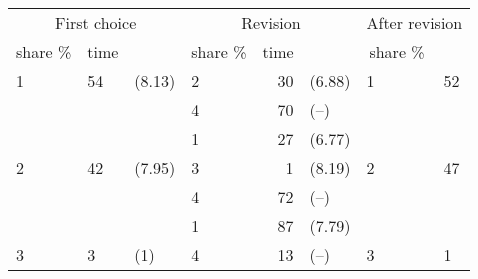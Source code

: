 
\begin{tabular}{llllrlll}
\toprule
\multicolumn{3}{c}{First choice} & \multicolumn{3}{c}{Revision} & \multicolumn{2}{c}{After revision} \\
\cmidrule(l{3pt}r{3pt}){1-3} \cmidrule(l{3pt}r{3pt}){4-6} \cmidrule(l{3pt}r{3pt}){7-8}
\multicolumn{1}{c}{share \%} & \multicolumn{1}{c}{time} & \multicolumn{1}{c}{} & \multicolumn{1}{c}{share \%} & \multicolumn{1}{c}{time} & \multicolumn{1}{c}{} & \multicolumn{1}{c}{share \%} \\
\cmidrule(l{3pt}r{3pt}){1-1} \cmidrule(l{3pt}r{3pt}){2-2} \cmidrule(l{3pt}r{3pt}){4-4} \cmidrule(l{3pt}r{3pt}){5-5} \cmidrule(l{3pt}r{3pt}){7-7}
1 & 54 & (8.13) & 2 & 30 & (6.88) & 1 & 52\\
 &  &  & 4 & 70 & (--) &  & \\
 &  &  & 1 & 27 & (6.77) &  & \\
2 & 42 & (7.95) & 3 & 1 & (8.19) & 2 & 47\\
 &  &  & 4 & 72 & (--) &  & \\
\addlinespace
 &  &  & 1 & 87 & (7.79) &  & \\
3 & 3 & (1) & 4 & 13 & (--) & 3 & 1\\
\bottomrule
\end{tabular}

